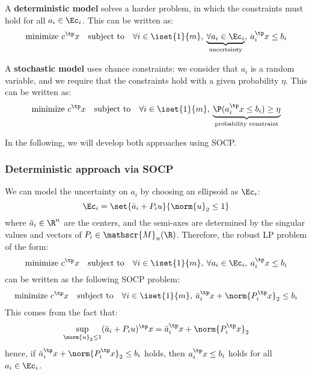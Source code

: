 A \textbf{deterministic model} solves a harder problem, in which the constraints must hold for all $a_i\in\Ec_i$. This can be written as:
\begin{equation*}
    \text{minimize } c^\tp x \quad\text{subject to}\quad \forall i\in\iset{1}{m}, \: \underbrace{\forall a_i\in\Ec_i}_{\text{uncertainty}}, \: a_i^\tp x\leq b_i
\end{equation*}

A \textbf{stochastic model} uses chance constraints: we consider that $a_i$ is a random variable, and we require that the constraints hold with a given probability $\eta$. This can be written as:
\begin{equation*}
    \text{minimize } c^\tp x \quad\text{subject to}\quad \forall i\in\iset{1}{m}, \: \underbrace{\P(a_i^\tp x\leq b_i)\geq\eta}_{\text{probability constraint}}
\end{equation*}

In the following, we will develop both approaches using SOCP.

\subsubsection{Deterministic approach via SOCP}
We can model the uncertainty on $a_i$ by choosing an ellipsoid as $\Ec_i$:
\begin{equation*}
    \Ec_i = \set{\bar{a}_i+P_iu}{\norm{u}_2\leq1}
\end{equation*}
where $\bar{a}_i\in\R^n$ are the centers, and the semi-axes are determined by the singular values and vectors of $P_i\in\mathscr{M}_n(\R)$. Therefore, the robust LP problem of the form:
\begin{equation*}
    \text{minimize } c^\tp x \quad\text{subject to}\quad \forall i\in\iset{1}{m}, \: \forall a_i\in\Ec_i, \: a_i^\tp x\leq b_i
\end{equation*}
can be written as the following SOCP problem:
\begin{equation*}
    \text{minimize } c^\tp x \quad\text{subject to}\quad \forall i\in\iset{1}{m}, \: \bar{a}_i^\tp x + \norm{P_i^\tp x}_2\leq b_i
\end{equation*}
This comes from the fact that:
\begin{equation*}
    \sup_{\norm{u}_2\leq1} (\bar{a}_i + P_iu)^\tp x = \bar{a}_i^\tp x + \norm{P_i^\tp x}_2
\end{equation*}
hence, if $\bar{a}_i^\tp x + \norm{P_i^\tp x}_2\leq b_i$ holds, then $a_i^\tp x\leq b_i$ holds for all $a_i\in\Ec_i$.

